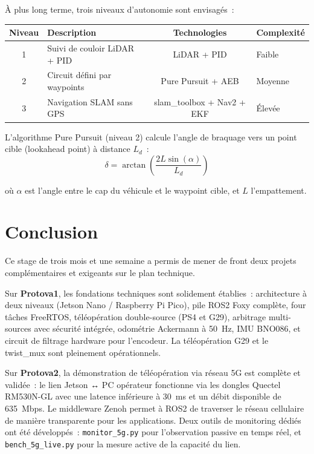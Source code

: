 \documentclass[a4paper,11pt]{article}
\begin{document}
À plus long terme, trois niveaux d'autonomie sont envisagés~:

\begin{center}
\begin{tabularx}{\textwidth}{@{}cXcl@{}}
\toprule
\textbf{Niveau} & \textbf{Description} & \textbf{Technologies} & \textbf{Complexité} \\
\midrule
1 & Suivi de couloir LiDAR + PID & LiDAR + PID & Faible \\
2 & Circuit défini par waypoints & Pure Pursuit + AEB & Moyenne \\
3 & Navigation SLAM sans GPS & slam\_toolbox + Nav2 + EKF & Élevée \\
\bottomrule
\end{tabularx}
\end{center}

L'algorithme Pure Pursuit (niveau 2) calcule l'angle de braquage vers un point
cible (lookahead point) à distance $L_d$~:
\begin{equation}
  \delta = \arctan\!\left(\frac{2 L \sin(\alpha)}{L_d}\right)
\end{equation}

où $\alpha$ est l'angle entre le cap du véhicule et le waypoint cible, et $L$
l'empattement.


\newpage
\section{Conclusion}

Ce stage de trois mois et une semaine a permis de mener de front deux projets
complémentaires et exigeants sur le plan technique.

Sur \textbf{Protova1}, les fondations techniques sont solidement établies~: architecture
à deux niveaux (Jetson Nano / Raspberry Pi Pico), pile ROS2 Foxy complète, four
tâches FreeRTOS, téléopération double-source (PS4 et G29), arbitrage multi-sources
avec sécurité intégrée, odométrie Ackermann à 50~Hz, IMU BNO086, et circuit de
filtrage hardware pour l'encodeur. La téléopération G29 et le twist\_mux sont
pleinement opérationnels.

Sur \textbf{Protova2}, la démonstration de téléopération via réseau 5G est complète
et validée~: le lien Jetson ↔ PC opérateur fonctionne via les dongles Quectel
RM530N-GL avec une latence inférieure à 30~ms et un débit disponible de 635~Mbps.
Le middleware Zenoh permet à ROS2 de traverser le réseau cellulaire de manière
transparente pour les applications. Deux outils de monitoring dédiés ont été
développés~: \texttt{monitor\_5g.py} pour l'observation passive en temps réel, et
\texttt{bench\_5g\_live.py} pour la mesure active de la capacité du lien.
\end{document}
